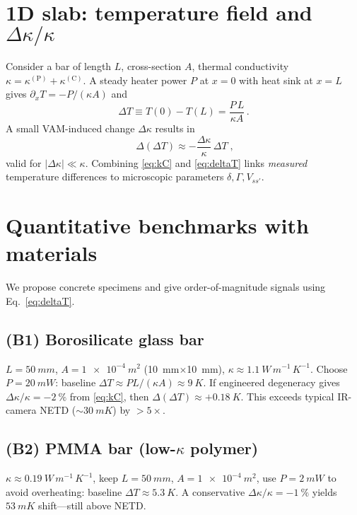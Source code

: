 \documentclass[12pt]{article}
\begin{document}
\section{1D slab: temperature field and $\Delta\kappa/\kappa$}
Consider a bar of length $L$, cross-section $A$, thermal conductivity $\kappa=\kappa^{(\mathrm P)}+\kappa^{(\mathrm C)}$. A steady heater power $P$ at $x=0$ with heat sink at $x=L$ gives $\partial_x T = -P/(\kappa A)$ and
\begin{equation}
\Delta T \equiv T(0)-T(L) = \frac{P\,L}{\kappa A}\,.
\end{equation}
A small VAM-induced change $\Delta\kappa$ results in
\begin{equation}
\boxed{\;\Delta(\Delta T) \approx -\frac{\Delta\kappa}{\kappa}\,\Delta T\;,}\label{eq:deltaT}
\end{equation}
valid for $|\Delta\kappa|\ll\kappa$. Combining \eqref{eq:kC} and \eqref{eq:deltaT} links \emph{measured} temperature differences to microscopic parameters $\delta,\Gamma, V_{ss'}$.


\section{Quantitative benchmarks with materials}
We propose concrete specimens and give order-of-magnitude signals using Eq.~\eqref{eq:deltaT}.


\subsection*{(B1) Borosilicate glass bar}
$L=\SI{50}{mm}$, $A=\SI{1e-4}{m^2}$ (\SI{10}{mm}$\times$\SI{10}{mm}), $\kappa\approx\SI{1.1}{W\,m^{-1}\,K^{-1}}$. Choose $P=\SI{20}{mW}$: baseline $\Delta T \approx P L/(\kappa A) \approx \SI{9}{K}$. If engineered degeneracy gives $\Delta\kappa/\kappa=\SI{-2}{\percent}$ from \eqref{eq:kC}, then $\Delta(\Delta T)\approx+\SI{0.18}{K}$. This exceeds typical IR-camera NETD ($\sim\SI{30}{mK}$) by $>5\times$.


\subsection*{(B2) PMMA bar (low-$\kappa$ polymer)}
$\kappa\approx\SI{0.19}{W\,m^{-1}\,K^{-1}}$, keep $L=\SI{50}{mm}$, $A=\SI{1e-4}{m^2}$, use $P=\SI{2}{mW}$ to avoid overheating: baseline $\Delta T\!\approx\!\SI{5.3}{K}$. A conservative $\Delta\kappa/\kappa=\SI{-1}{\percent}$ yields $\SI{53}{mK}$ shift---still above NETD.
\end{document}
